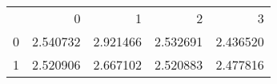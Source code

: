 \begin{tabular}{lrrrr}
 & 0 & 1 & 2 & 3 \\
0 & 2.540732 & 2.921466 & 2.532691 & 2.436520 \\
1 & 2.520906 & 2.667102 & 2.520883 & 2.477816 \\
\end{tabular}
